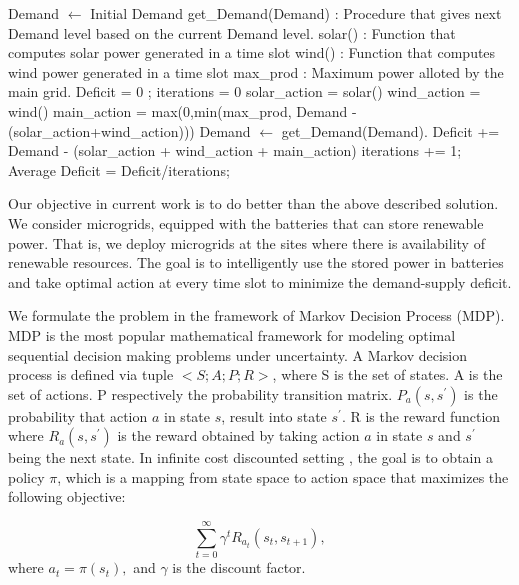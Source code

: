 \documentclass[conference]{IEEEtran}
\begin{document}
\begin{algorithm}
\caption{}
\label{greedy}
\begin{algorithmic}[1]
	\State Demand $\leftarrow$ Initial Demand
    \State get\_Demand(Demand) : Procedure that gives next Demand level based on the current Demand level.
    \State solar() : Function that computes solar power generated in a time slot
    \State wind() : Function that computes wind power generated in a time slot
    \State max\_prod : Maximum power alloted by the main grid.
    \State Deficit = 0 ; iterations = 0
     \State solar\_action = solar()
     \State wind\_action = wind()
     \State main\_action = max(0,min(max\_prod, Demand - (solar\_action+wind\_action)))
     \State Demand $\leftarrow$ get\_Demand(Demand).
     \State Deficit += Demand - (solar\_action + wind\_action + main\_action)
     \State iterations += 1;
    \EndProcedure
    \State Average Deficit = Deficit/iterations;
    
\end{algorithmic}
\end{algorithm}


Our objective in current work is to do better than the above described solution. We consider microgrids, equipped with the batteries that can store renewable power. That is, we deploy microgrids at the sites where there is availability of renewable resources. The goal is to intelligently use the stored power in batteries and take optimal action at every time slot to minimize the demand-supply deficit.

We formulate the problem in the framework of Markov Decision Process (MDP). MDP \cite{sutton} is the most popular mathematical framework for modeling optimal sequential decision making problems under uncertainty. A Markov decision process is defined via tuple $< S; A; P;R >$, where S is the set of states. A is the set of actions. P respectively the probability transition matrix. $P_{a}(s,s^{'})$ is the probability that action $a$ in state $s$, result into state $s^{'}$. R is the reward function where $R_{a}(s,s^{'})$ is the reward obtained by taking action $a$ in state $s$ and $s^{'}$ being the next state. In infinite cost discounted setting \cite{vol1}, the goal is to obtain a policy $\pi$, which is a mapping from state space to action space that maximizes the following objective:

\begin{equation}
\sum_{t = 0}^{\infty} \gamma^{t}R_{a_{t}}(s_{t},s_{t+1}),
\end{equation}
where $a_{t} = \pi(s_{t}),$ and $\gamma$ is the discount factor.
\end{document}
